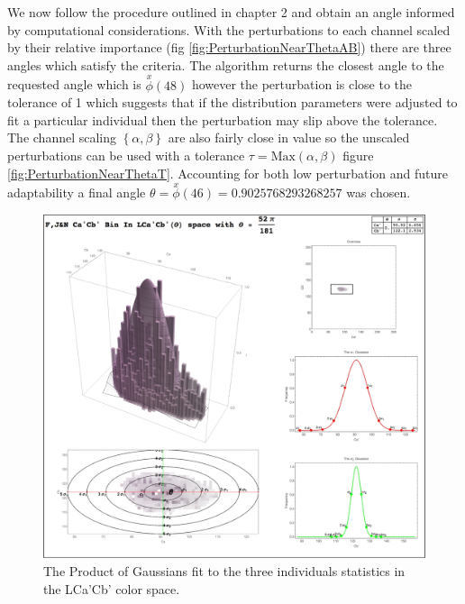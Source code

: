 We now follow the procedure outlined in chapter 2 and obtain an angle informed by computational considerations.  
With the perturbations to each channel scaled by their relative importance (fig \ref{fig:PerturbationNearThetaAB}) there are three angles which satisfy the criteria.
 The algorithm returns the closest angle to the requested angle which is $\overset{x}{\phi } (48)$ however the perturbation is close to the tolerance of 1 which suggests that if the distribution parameters were adjusted to fit a particular individual then the perturbation may slip above the tolerance. 
 The channel scaling $\left\{ \alpha, \beta\right\} $ are also fairly close in value so the unscaled perturbations can be used with a tolerance $\tau = \text{Max}\left(\alpha, \beta\right)$ figure \ref{fig:PerturbationNearThetaT}. 
 Accounting for both low perturbation and future adaptability a final angle $\theta = \overset{x}{\phi }(46) = 0.9025768293268257$ was chosen.

\begin{figure}[h!]
  \centering
  \includegraphics[width=1.0 \textwidth]{Chapter3/Figs/Fit_the_Gaussian_Final.jpg} 
    \caption{The Product of Gaussians fit to the three individuals statistics in the LCa'Cb' color space.  }  \label{fig:FittheGaussianFinal}
\end{figure}

